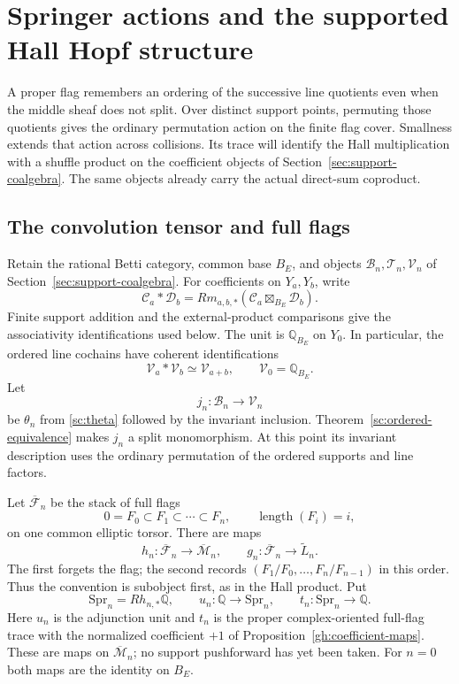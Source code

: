 \section{Springer actions and the supported Hall Hopf structure}
\label{sec:supported-springer}

A proper flag remembers an ordering of the successive line quotients
even when the middle sheaf does not split. Over distinct support points,
permuting those quotients gives the ordinary permutation action on the
finite flag cover. Smallness extends that action across collisions.
Its trace will identify the Hall multiplication with a shuffle product
on the coefficient objects of Section~\ref{sec:support-coalgebra}.
The same objects already carry the actual direct-sum coproduct.

\subsection{The convolution tensor and full flags}

Retain the rational Betti category, common base $B_E$, and objects
$\mathcal B_n,\mathcal T_n,\mathcal V_n$ of
Section~\ref{sec:support-coalgebra}. For coefficients on $Y_a,Y_b$,
write
\begin{equation}\label{sh:convolution}
 \mathcal C_a*\mathcal D_b
 =Rm_{a,b,*}(\mathcal C_a\boxtimes_{B_E}\mathcal D_b).
\end{equation}
Finite support addition and the external-product comparisons give
the associativity identifications used below. The unit is
$\mathbb Q_{B_E}$ on $Y_0$. In particular, the ordered line
cochains have coherent identifications
\[
 \mathcal V_a*\mathcal V_b\simeq\mathcal V_{a+b},
 \qquad \mathcal V_0=\mathbb Q_{B_E}.
\]
Let
\begin{equation}\label{sh:ordered-inclusion}
 j_n:\mathcal B_n\longrightarrow\mathcal V_n
\end{equation}
be $\theta_n$ from \eqref{sc:theta} followed by the invariant
inclusion. Theorem~\ref{sc:ordered-equivalence} makes $j_n$ a
split monomorphism. At this point its invariant description uses
the ordinary permutation of the ordered supports and line factors.

Let $\overline{\mathcal F}_n$ be the stack of full flags
\[
 0=F_0\subset F_1\subset\cdots\subset F_n,
 \qquad \operatorname{length}(F_i)=i,
\]
on one common elliptic torsor. There are maps
\[
 h_n:\overline{\mathcal F}_n\longrightarrow
                    \overline{\mathcal M}_n,
 \qquad
 g_n:\overline{\mathcal F}_n\longrightarrow\widetilde L_n.
\]
The first forgets the flag; the second records
$(F_1/F_0,\ldots,F_n/F_{n-1})$ in this order. Thus the convention
is subobject first, as in the Hall product. Put
\[
 \mathrm{Spr}_n=Rh_{n,*}\mathbb Q,
 \qquad
 u_n:\mathbb Q\longrightarrow\mathrm{Spr}_n,
 \qquad
 t_n:\mathrm{Spr}_n\longrightarrow\mathbb Q.
\]
Here $u_n$ is the adjunction unit and $t_n$ is the proper
complex-oriented full-flag trace with the normalized coefficient
$+1$ of Proposition~\ref{gh:coefficient-maps}. These are maps on
$\overline{\mathcal M}_n$; no support pushforward has yet been
taken. For $n=0$ both maps are the identity on $B_E$.

